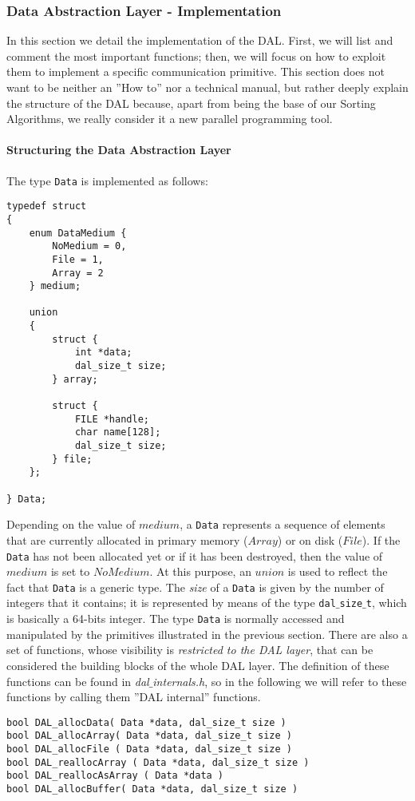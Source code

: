 \subsubsection{Data Abstraction Layer - Implementation}
\label{DAL-impl}
In this section we detail the implementation of the DAL. First, we will list and comment the most important functions; then, we will focus on how to exploit them to implement a specific communication primitive. This section does not want to be neither an ''How to'' nor a technical manual, but rather deeply explain the structure of the DAL because, apart from being the base of our Sorting Algorithms, we really consider it a new parallel programming tool.

\paragraph{Structuring the Data Abstraction Layer}
The type \texttt{Data} is implemented as follows:
\begin{lstlisting}
typedef struct
{
	enum DataMedium {
		NoMedium = 0,
		File = 1,
		Array = 2
	} medium;
	
	union 
	{
		struct {
			int *data;
			dal_size_t size;
		} array;
		
		struct {
			FILE *handle;
			char name[128];
			dal_size_t size;
		} file;
	};
	
} Data;
\end{lstlisting}
Depending on the value of $medium$, a \texttt{Data} represents a sequence of elements that are currently allocated in primary memory ($Array$) or on disk ($File$). If the \texttt{Data} has not been allocated yet or if it has been destroyed, then the value of $medium$ is set to $NoMedium$. At this purpose, an $union$ is used to reflect the fact that \texttt{Data} is a generic type. The \textit{size} of a \texttt{Data} is given by the number of integers that it contains; it is represented by means of the type \texttt{dal$\_$size$\_$t}, which is basically a 64-bits integer. The type \texttt{Data} is normally accessed and manipulated by the primitives illustrated in the previous section. There are also a set of functions, whose visibility is \textit{restricted to the DAL layer}, that can be considered the building blocks of the whole DAL layer. The definition of these functions can be found in \textit{dal$\_$internals.h}, so in the following we will refer to these functions by calling them ''DAL internal'' functions.
\begin{lstlisting}
bool DAL_allocData( Data *data, dal_size_t size )
bool DAL_allocArray( Data *data, dal_size_t size )
bool DAL_allocFile ( Data *data, dal_size_t size )
bool DAL_reallocArray ( Data *data, dal_size_t size )
bool DAL_reallocAsArray ( Data *data )
bool DAL_allocBuffer( Data *data, dal_size_t size )
\end{lstlisting}
